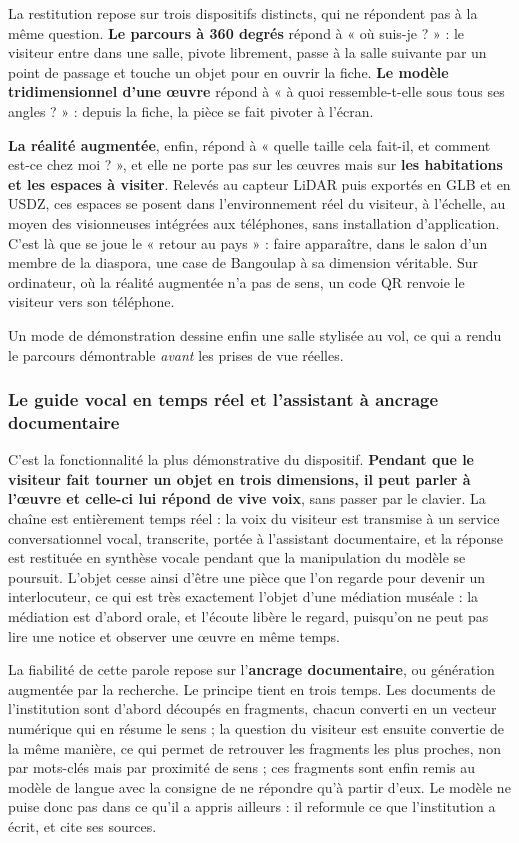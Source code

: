 La restitution repose sur trois dispositifs distincts, qui ne répondent pas à la
même question. \textbf{Le parcours à 360 degrés} répond à « où suis-je ? » : le
visiteur entre dans une salle, pivote librement, passe à la salle suivante par
un point de passage et touche un objet pour en ouvrir la fiche. \textbf{Le
modèle tridimensionnel d'une œuvre} répond à « à quoi ressemble-t-elle sous tous
ses angles ? » : depuis la fiche, la pièce se fait pivoter à l'écran.

\textbf{La réalité augmentée}, enfin, répond à « quelle taille cela fait-il, et
comment est-ce chez moi ? », et elle ne porte pas sur les œuvres mais sur
\textbf{les habitations et les espaces à visiter}. Relevés au capteur LiDAR puis
exportés en GLB et en USDZ, ces espaces se posent dans l'environnement réel du
visiteur, à l'échelle, au moyen des visionneuses intégrées aux téléphones, sans
installation d'application. C'est là que se joue le « retour au pays » : faire
apparaître, dans le salon d'un membre de la diaspora, une case de Bangoulap à sa
dimension véritable. Sur ordinateur, où la réalité augmentée n'a pas de sens, un
code QR renvoie le visiteur vers son téléphone.

Un mode de démonstration dessine enfin une salle stylisée au vol, ce qui a rendu
le parcours démontrable \emph{avant} les prises de vue réelles.

\subsubsection{Le guide vocal en temps réel et l'assistant à ancrage documentaire}

C'est la fonctionnalité la plus démonstrative du dispositif. \textbf{Pendant que
le visiteur fait tourner un objet en trois dimensions, il peut parler à l'œuvre
et celle-ci lui répond de vive voix}, sans passer par le clavier. La chaîne est
entièrement temps réel : la voix du visiteur est transmise à un service
conversationnel vocal, transcrite, portée à l'assistant documentaire, et la
réponse est restituée en synthèse vocale pendant que la manipulation du modèle
se poursuit. L'objet cesse ainsi d'être une pièce que l'on regarde pour devenir
un interlocuteur, ce qui est très exactement l'objet d'une médiation muséale :
la médiation est d'abord orale, et l'écoute libère le regard, puisqu'on ne peut
pas lire une notice et observer une œuvre en même temps.

La fiabilité de cette parole repose sur l'\textbf{ancrage documentaire}, ou
génération augmentée par la recherche. Le principe tient en trois temps. Les
documents de l'institution sont d'abord découpés en fragments, chacun converti
en un vecteur numérique qui en résume le sens ; la question du visiteur est
ensuite convertie de la même manière, ce qui permet de retrouver les fragments
les plus proches, non par mots-clés mais par proximité de sens ; ces fragments
sont enfin remis au modèle de langue avec la consigne de ne répondre qu'à partir
d'eux. Le modèle ne puise donc pas dans ce qu'il a appris ailleurs : il
reformule ce que l'institution a écrit, et cite ses sources.

